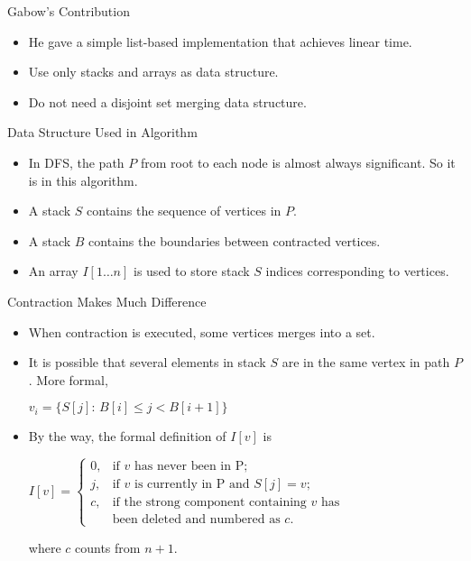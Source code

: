 \documentclass{beamer}
\begin{document}
\begin{frame}{Gabow's Contribution}%

	\begin{itemize}
		\item
		He gave a simple list-based implementation that achieves linear time.
		\item
		Use only stacks and arrays as data structure. %
		\item
		Do not need a disjoint set merging data structure.
	\end{itemize}
\end{frame}

\begin{frame}{Data Structure Used in Algorithm}
	\begin{itemize}
		\item
		In DFS, the \alert{path $P$} from root to each node is almost always significant. So it is in this algorithm.
		\item
		A \alert{stack $S$} contains the sequence of vertices in $P$.
		\item
		A \alert{stack $B$} contains the boundaries between contracted vertices.
		\item
		An array \alert{$I[1\ldots n]$} is used to store stack $S$ indices corresponding to vertices.
	\end{itemize}
\end{frame}

\begin{frame}{Contraction Makes Much Difference}
	\begin{itemize}
		\item
		When contraction is executed, some vertices merges into a set.
		\item
		It is possible that several elements in stack $S$ are in the same vertex in path $P$.
		More formal, 
		\begin{center}
			$v_i=\{S[j]:\, B[i]\leq j< B[i+1]\}$
		\end{center}
		\item
		By the way, the formal definition of $I[v]$ is
		\begin{center}
			$I[v]=\begin{cases}
			0, & \text{if }v\text{ has never been in P;} \\
			j, & \text{if }v\text{ is currently in P and }S[j]=v\text{;} \\
			c, & \text{if the strong component containing }v\text{ has}\\
			& \text{been deleted and numbered as }c\text{.}
			\end{cases}$
		\end{center}
		where $c$ counts from $n+1$.
	\end{itemize}
\end{frame}
\end{document}
